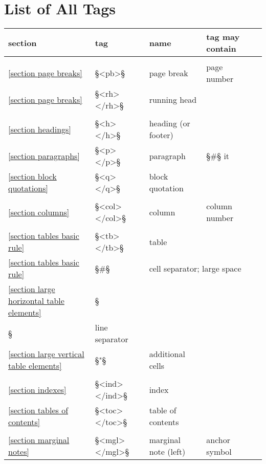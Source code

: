  

\newpage
\appendix


\section{List of All Tags}
\label{appendix list of all tags}

\newcommand{\eins}{{\fontspec{DejaVu Sans}{①}}}
\newcommand{\zwei}{{\fontspec{DejaVu Sans}{②}}}

\begin{longtable}[l]{@{}llll@{}l@{}}
section & tag & name & tag may contain \\[1mm]
\hline \\
\ref{section page breaks} & §<pb>§ & page break & page number & \eins \\
\ref{section page breaks} & §<rh> </rh>§ & running head && \eins \\
\\
\ref{section headings} & §<h> </h>§ & heading (or footer) && \eins \\
\ref{section paragraphs} & §<p> </p>§ & paragraph & §#§ it & \eins \\
\ref{section block quotations} & §<q> </q>§ & block quotation && \eins \\
\\
\ref{section columns} & §<col> </col>§ & column & column number & \eins \\
\\
\ref{section tables basic rule} & §<tb> </tb>§ & table && \eins \\
\ref{section tables basic rule} & §#§ & \multicolumn{2}{l}{cell separator; large space} \\
\ref{section large horizontal table elements} & §\\§ & line separator && \\
\ref{section large vertical table elements} & §"§ & additional cells && \\
\\
\ref{section indexes} & §<ind> </ind>§ & index && \eins \\
\ref{section tables of contents} & §<toc> </toc>§ & table of contents && \eins \\
\\
\ref{section marginal notes} & §<mgl> </mgl>§ & marginal note (left) & anchor symbol & \eins \\

\end{longtable}
